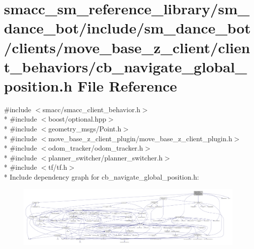\hypertarget{smacc__sm__reference__library_2sm__dance__bot_2include_2sm__dance__bot_2clients_2move__base__z__4f98f2fc60ce0041c06779ddc6689af4}{}\section{smacc\+\_\+sm\+\_\+reference\+\_\+library/sm\+\_\+dance\+\_\+bot/include/sm\+\_\+dance\+\_\+bot/clients/move\+\_\+base\+\_\+z\+\_\+client/client\+\_\+behaviors/cb\+\_\+navigate\+\_\+global\+\_\+position.h File Reference}
\label{smacc__sm__reference__library_2sm__dance__bot_2include_2sm__dance__bot_2clients_2move__base__z__4f98f2fc60ce0041c06779ddc6689af4}
{\ttfamily \#include $<$smacc/smacc\+\_\+client\+\_\+behavior.\+h$>$}\\*
{\ttfamily \#include $<$boost/optional.\+hpp$>$}\\*
{\ttfamily \#include $<$geometry\+\_\+msgs/\+Point.\+h$>$}\\*
{\ttfamily \#include $<$move\+\_\+base\+\_\+z\+\_\+client\+\_\+plugin/move\+\_\+base\+\_\+z\+\_\+client\+\_\+plugin.\+h$>$}\\*
{\ttfamily \#include $<$odom\+\_\+tracker/odom\+\_\+tracker.\+h$>$}\\*
{\ttfamily \#include $<$planner\+\_\+switcher/planner\+\_\+switcher.\+h$>$}\\*
{\ttfamily \#include $<$tf/tf.\+h$>$}\\*
Include dependency graph for cb\+\_\+navigate\+\_\+global\+\_\+position.\+h\+:
\nopagebreak
\begin{figure}[H]
\begin{center}
\leavevmode
\includegraphics[width=350pt]{smacc__sm__reference__library_2sm__dance__bot_2include_2sm__dance__bot_2clients_2move__base__z__20180d591529a3a9400eb5e34518f485}
\end{center}
\end{figure}
